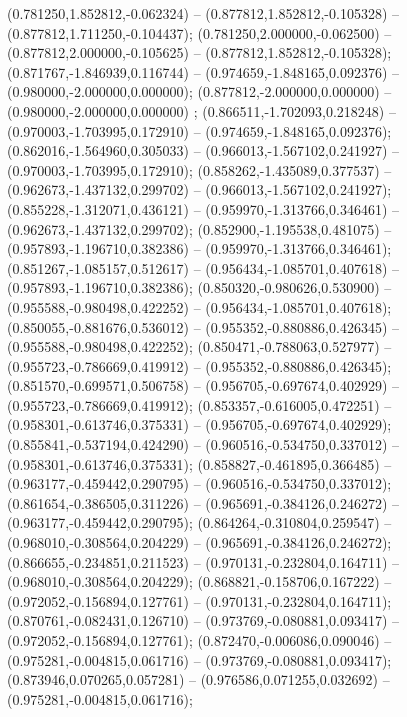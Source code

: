  (0.781250,1.852812,-0.062324) -- (0.877812,1.852812,-0.105328) -- (0.877812,1.711250,-0.104437);
 (0.781250,2.000000,-0.062500) -- (0.877812,2.000000,-0.105625) -- (0.877812,1.852812,-0.105328);
 (0.871767,-1.846939,0.116744) -- (0.974659,-1.848165,0.092376) -- (0.980000,-2.000000,0.000000);
 (0.877812,-2.000000,0.000000) -- (0.980000,-2.000000,0.000000) ;
 (0.866511,-1.702093,0.218248) -- (0.970003,-1.703995,0.172910) -- (0.974659,-1.848165,0.092376);
 (0.862016,-1.564960,0.305033) -- (0.966013,-1.567102,0.241927) -- (0.970003,-1.703995,0.172910);
 (0.858262,-1.435089,0.377537) -- (0.962673,-1.437132,0.299702) -- (0.966013,-1.567102,0.241927);
 (0.855228,-1.312071,0.436121) -- (0.959970,-1.313766,0.346461) -- (0.962673,-1.437132,0.299702);
 (0.852900,-1.195538,0.481075) -- (0.957893,-1.196710,0.382386) -- (0.959970,-1.313766,0.346461);
 (0.851267,-1.085157,0.512617) -- (0.956434,-1.085701,0.407618) -- (0.957893,-1.196710,0.382386);
 (0.850320,-0.980626,0.530900) -- (0.955588,-0.980498,0.422252) -- (0.956434,-1.085701,0.407618);
 (0.850055,-0.881676,0.536012) -- (0.955352,-0.880886,0.426345) -- (0.955588,-0.980498,0.422252);
 (0.850471,-0.788063,0.527977) -- (0.955723,-0.786669,0.419912) -- (0.955352,-0.880886,0.426345);
 (0.851570,-0.699571,0.506758) -- (0.956705,-0.697674,0.402929) -- (0.955723,-0.786669,0.419912);
 (0.853357,-0.616005,0.472251) -- (0.958301,-0.613746,0.375331) -- (0.956705,-0.697674,0.402929);
 (0.855841,-0.537194,0.424290) -- (0.960516,-0.534750,0.337012) -- (0.958301,-0.613746,0.375331);
 (0.858827,-0.461895,0.366485) -- (0.963177,-0.459442,0.290795) -- (0.960516,-0.534750,0.337012);
 (0.861654,-0.386505,0.311226) -- (0.965691,-0.384126,0.246272) -- (0.963177,-0.459442,0.290795);
 (0.864264,-0.310804,0.259547) -- (0.968010,-0.308564,0.204229) -- (0.965691,-0.384126,0.246272);
 (0.866655,-0.234851,0.211523) -- (0.970131,-0.232804,0.164711) -- (0.968010,-0.308564,0.204229);
 (0.868821,-0.158706,0.167222) -- (0.972052,-0.156894,0.127761) -- (0.970131,-0.232804,0.164711);
 (0.870761,-0.082431,0.126710) -- (0.973769,-0.080881,0.093417) -- (0.972052,-0.156894,0.127761);
 (0.872470,-0.006086,0.090046) -- (0.975281,-0.004815,0.061716) -- (0.973769,-0.080881,0.093417);
 (0.873946,0.070265,0.057281) -- (0.976586,0.071255,0.032692) -- (0.975281,-0.004815,0.061716);
